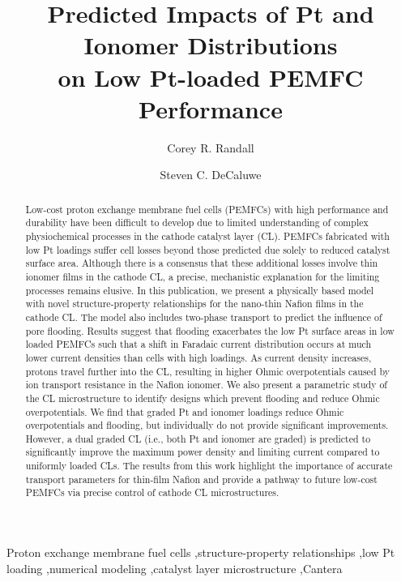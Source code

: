 \documentclass[final,3p,times,twocolumn]{elsarticle}    %
\begin{document}
\begin{frontmatter}

\title{Predicted Impacts of Pt and Ionomer Distributions \\ 
       on Low Pt-loaded PEMFC Performance}

\author[CSM]{Corey R. Randall}
\author[CSM]{Steven C. DeCaluwe }
        
\address[CSM]{Colorado School of Mines, 1500 Illinois St, Golden, CO 80401}

\begin{abstract} 
Low-cost proton exchange membrane fuel cells (PEMFCs) with high performance and durability have been difficult to develop due to limited understanding of complex physiochemical processes in the cathode catalyst layer (CL). PEMFCs fabricated with low Pt loadings suffer cell losses beyond those predicted due solely to reduced catalyst surface area. Although there is a consensus that these additional losses involve thin ionomer films in the cathode CL, a precise, mechanistic explanation for the limiting processes remains elusive. In this publication, we present a physically based model with novel structure-property relationships for the nano-thin Nafion films in the cathode CL. The model also includes two-phase transport to predict the influence of pore flooding. Results suggest that flooding exacerbates the low Pt surface areas in low loaded PEMFCs such that a shift in Faradaic current distribution occurs at much lower current densities than cells with high loadings. As current density increases, protons travel further into the CL, resulting in higher Ohmic overpotentials caused by ion transport resistance in the Nafion ionomer. We also present a parametric study of the CL microstructure to identify designs which prevent flooding and reduce Ohmic overpotentials. We find that graded Pt and ionomer loadings reduce Ohmic overpotentials and flooding, but individually do not provide significant improvements. However, a dual graded CL (i.e., both Pt and ionomer are graded) is predicted to significantly improve the maximum power density and limiting current compared to uniformly loaded CLs. The results from this work highlight the importance of accurate transport parameters for thin-film Nafion and provide a pathway to future low-cost PEMFCs via precise control of cathode CL microstructures.
\end{abstract}

\begin{keyword}
Proton exchange membrane fuel cells \sep structure-property relationships \sep low Pt loading \sep numerical modeling \sep catalyst layer microstructure \sep Cantera
\end{keyword}

\end{frontmatter}
\end{document}
